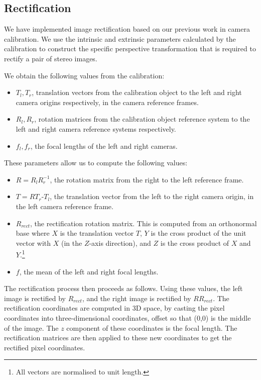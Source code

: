\subsection{Rectification}
\label{sec:rectification}

We have implemented image rectification based on our previous work in camera calibration.
We use the intrinsic and extrinsic parameters calculated by the calibration to
construct the specific perspective transformation that is required to rectify a pair of stereo images.

We obtain the following values from the calibration:
\begin{itemize}
\item $T_l, T_r$, translation vectors from the calibration object to the left
  and right camera origins respectively, in the camera reference frames.
\item $R_l, R_r$, rotation matrices from the calibration object reference system to
  the left and right camera reference systems respectively.
\item $f_l, f_r$, the focal lengths of the left and right cameras.
\end{itemize}

These parameters allow us to compute the following values:
\begin{itemize}
\item $R=R_lR_r^{-1}$, the rotation matrix from the right to the left reference
  frame.
\item $T=RT_r$-$T_l$, the translation vector from the left to the right camera
  origin, in the left camera reference frame.
\item $R_{rect}$, the rectification rotation matrix. This is computed from an
 orthonormal base where $X$ is the translation vector $T$, $Y$ is the cross
  product of the unit vector with $X$ (in the $Z$-axis direction), and $Z$ is the
  cross product of $X$ and $Y$.\footnote{ All vectors are normalised to unit length.}
\item $f$, the mean of the left and right focal lengths.
\end{itemize}

The rectification process then proceeds as follows. Using these values, the left image is
rectified by $R_{rect}$, and the right image is rectified by $RR_{rect}$. The
rectification coordinates are computed in 3D space, by casting the pixel
coordinates into three-dimensional coordinates, offset so that (0,0) is the
middle of the image. The $z$ component of these coordinates is the focal length. The rectification matrices are then applied to these new coordinates to get the rectified pixel coordinates.

